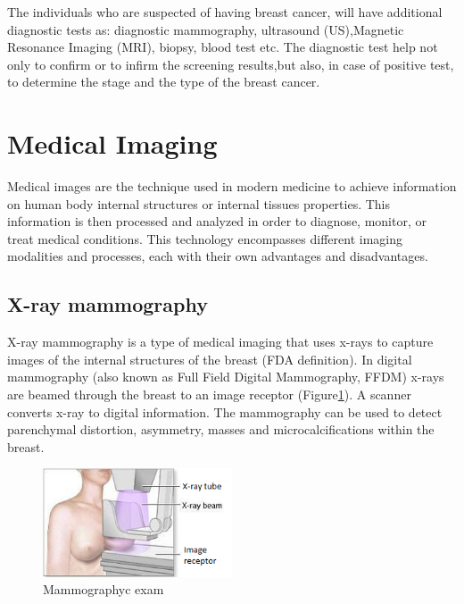 The individuals who are suspected of having breast cancer, will have additional diagnostic tests as: diagnostic mammography, ultrasound (US),Magnetic Resonance Imaging (MRI), biopsy, blood test etc. The diagnostic test help not only to confirm or to infirm the screening results,but also, in case of positive test,  to determine the stage and the type of the breast cancer.
\section{Medical Imaging}\label{section:medicalimaging}
 
Medical images are the technique used in modern medicine to achieve information on human body internal structures or internal tissues properties. This information is then processed and analyzed in order to diagnose, monitor, or treat medical conditions. This technology encompasses different imaging modalities and processes, each with their own advantages and disadvantages.

 

\subsection{X-ray mammography}\label{subsection:mammography}

X-ray mammography is a type of medical imaging that uses x-rays to capture images of the internal structures of the breast (FDA  definition). In digital mammography (also known as Full Field Digital Mammography, FFDM) x-rays are beamed through the breast to an image receptor (Figure\ref{fig:mammographyc ecam}). A scanner converts x-ray to digital information. The mammography can be used to detect parenchymal distortion, asymmetry, masses and microcalcifications within the breast. 

	
\begin{figure}[!h]
\centering
\includegraphics[width=0.5\textwidth,keepaspectratio]{figures/xraymammo.PNG} 
\caption[Mammographyc exam]{Mammographyc exam}
\label{fig:mammographyc ecam}
\end{figure} 

